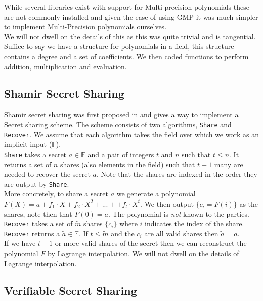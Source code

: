 \documentclass[ %
                    author={Nicholas Tutte},
                supervisor={Prof. Nigel Smart},
                    degree={MEng},
                     title={Secure Two Party Computation},
                  subtitle={A practical comparison of recent protocols},
                      type={Research - GG1K},
                      year={2015} ]{dissertation}
\begin{document}
				While several libraries exist with support for Multi-precision polynomials these are not commonly installed and given the ease of using GMP it was much simpler to implement Multi-Precision polynomials ourselves.\\

				We will not dwell on the details of this as this was quite trivial and is tangential. Suffice to say we have a structure for polynomials in a field, this structure contains a degree and a set of coefficients. We then coded functions to perform addition, multiplication and evaluation.

			\subsection{Shamir Secret Sharing}
				Shamir secret sharing was first proposed in \cite{ShamirSecretSharing} and gives a way to implement a Secret sharing scheme. The scheme consists of two algorithms, \texttt{Share} and \texttt{Recover}. We assume that each algorithm takes the field over which we work as an implicit input ($\mathbb{F}$).\\

				\texttt{Share} takes a secret $a \in \mathbb{F}$ and a pair of integers $t$ and $n$ such that $t \leq n$. It returns a set of $n$ shares (also elements in the field) such that $t + 1$ many are needed to recover the secret $a$. Note that the shares are indexed in the order they are output by \texttt{Share}.\\

				More concretely, to share a secret $a$ we generate a polynomial $F(X) = a + f_1 \cdot X + f_2 \cdot X^2 + ... +  + f_t \cdot X ^ t$. We then output $\{c_i = F(i)\}$ as the shares, note then that $F(0) = a$. The polynomial is \emph{not} known to the parties.\\

				\texttt{Recover} takes a set of $\tilde m$ shares $\{c_i\}$ where $i$ indicates the index of the share. \texttt{Recover} returns a $ \tilde a \in \mathbb{F}$. If $t \leq \tilde m$ and the $c_i$ are all valid shares then $\tilde a = a$.\\

				If we have $t + 1$ or more valid shares of the secret then we can reconstruct the polynomial $F$ by Lagrange interpolation. We will not dwell on the details of Lagrange interpolation.\\

			\subsection{Verifiable Secret Sharing}
\end{document}
